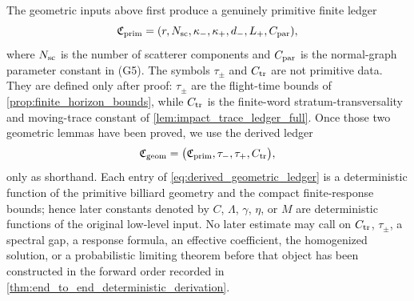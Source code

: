 \documentclass[12pt, letterpaper]{amsart}
\theoremstyle{plain}
\theoremstyle{definition}
\theoremstyle{remark}
\begin{document}
The geometric inputs above first produce a genuinely primitive finite
ledger
\begin{equation}
\label{eq:primitive_constant_vector}
    \mathfrak C_{\rm prim}
    =(r,N_{\rm sc},\kappa_-,\kappa_+,d_-,L_+,C_{\rm par}),
\end{equation}
where $N_{\rm sc}$ is the number of scatterer components and $C_{\rm par}$ is
the normal-graph parameter constant in \textup{(G5)}.  The symbols
$\tau_\pm$ and $C_{\rm tr}$ are not primitive data.  They are defined only after
proof: $\tau_\pm$ are the flight-time bounds of
\cref{prop:finite_horizon_bounds}, while $C_{\rm tr}$ is the finite-word
stratum-transversality and moving-trace constant of
\cref{lem:impact_trace_ledger_full}.  Once those two geometric lemmas have been
proved, we use the derived ledger
\begin{equation}
\label{eq:derived_geometric_ledger}
    \mathfrak C_{\rm geom}
    =\bigl(\mathfrak C_{\rm prim},\tau_-,\tau_+,C_{\rm tr}\bigr),
\end{equation}
only as shorthand.  Each entry of \eqref{eq:derived_geometric_ledger} is a
deterministic function of the primitive billiard geometry and the compact
finite-response bounds; hence later constants denoted by $C$, $\Lambda$,
$\gamma$, $\eta$, or $M$ are deterministic functions of the original low-level
input.  No later estimate may call on $C_{\rm tr}$, $\tau_\pm$, a spectral gap,
a response formula, an effective coefficient, the homogenized solution, or a
probabilistic limiting theorem before that object has been constructed in the
forward order recorded in \cref{thm:end_to_end_deterministic_derivation}.
\end{document}
